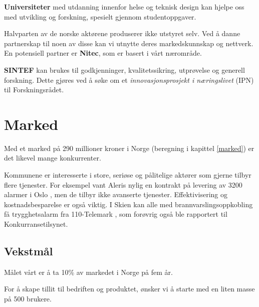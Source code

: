 \textbf{Universiteter} med utdanning innenfor helse og teknisk design kan
hjelpe oss med utvikling og forskning, spesielt gjennom studentoppgaver.


Halvparten av de norske aktørene produserer ikke utstyret selv. Ved å danne
partnerskap til noen av disse kan vi utnytte deres markedskunnskap og nettverk.
En potensiell partner er \textbf{Nitec}, som er basert i vårt nærområde.

\textbf{SINTEF} kan brukes til godkjenninger, kvalitetssikring, utprøvelse og
generell forskning. Dette gjøres ved å søke om et \textit{innovasjonsprosjekt i
næringslivet} (IPN) til Forskningsrådet.

\clearpage
\section{Marked}



Med et marked på 290 millioner kroner i Norge (beregning i kapittel
\vref{marked}) er det likevel mange konkurrenter.

Kommunene er interesserte i store, seriøse og pålitelige aktører som gjerne
tilbyr flere tjenester.  For eksempel vant Aleris nylig en kontrakt på levering
av 3200 alarmer i Oslo \cite{telenor.aleris}, men de tilbyr ikke avanserte
tjenester. Effektivisering og kostnadsbesparelse er også viktig. I Skien kan
alle med brannvarslingsoppkobling få trygghetsalarm fra 110-Telemark
\cite{telemark.konkurransetilsyn}, som forøvrig også ble rapportert til
Konkurransetilsynet.

\subsection{Vekstmål}

Målet vårt er å ta 10\% av markedet i Norge på fem år.


For å skape tillit til bedriften og produktet, ønsker vi å starte med en liten
masse på 500 brukere.

